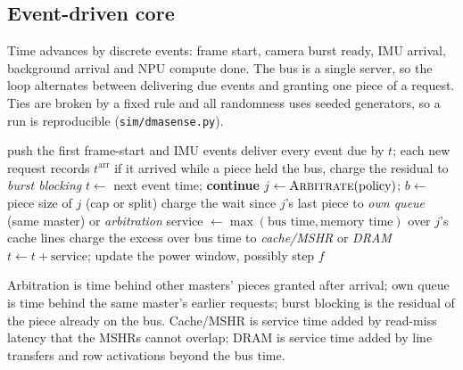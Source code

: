\documentclass[11pt,a4paper]{article}
\begin{document}
\subsection{Event-driven core}
Time advances by discrete events: frame start, camera burst ready, IMU arrival, background arrival and NPU compute done. The bus is a single server, so the loop alternates between delivering due events and granting one piece of a request. Ties are broken by a fixed rule and all randomness uses seeded generators, so a run is reproducible (\texttt{sim/dmasense.py}).
\begin{algorithm}[h]\caption{Event loop with stall attribution}
\begin{algorithmic}[1]
\State push the first frame-start and IMU events
  \State deliver every event due by $t$; each new request records $t^{\mathrm{arr}}$
  \State if it arrived while a piece held the bus, charge the residual to \textit{burst blocking}
   \State $t \gets$ next event time; \textbf{continue} \EndIf
  \State $j \gets \textsc{Arbitrate}(\text{policy})$; $b \gets$ piece size of $j$ (cap or split)
  \State charge the wait since $j$'s last piece to \textit{own queue} (same master) or \textit{arbitration}
  \State service $\gets \max(\text{bus time}, \text{memory time})$ over $j$'s cache lines
  \State charge the excess over bus time to \textit{cache/MSHR} or \textit{DRAM}
  \State $t \gets t+\text{service}$; update the power window, possibly step $f$
\EndWhile
\end{algorithmic}\end{algorithm}
Arbitration is time behind other masters' pieces granted after arrival; own queue is time behind the same master's earlier requests; burst blocking is the residual of the piece already on the bus. Cache/MSHR is service time added by read-miss latency that the MSHRs cannot overlap; DRAM is service time added by line transfers and row activations beyond the bus time.
\end{document}
